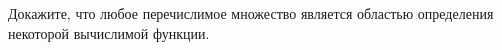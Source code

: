 Докажите, что любое перечислимое множество является областью определения некоторой вычислимой функции.
